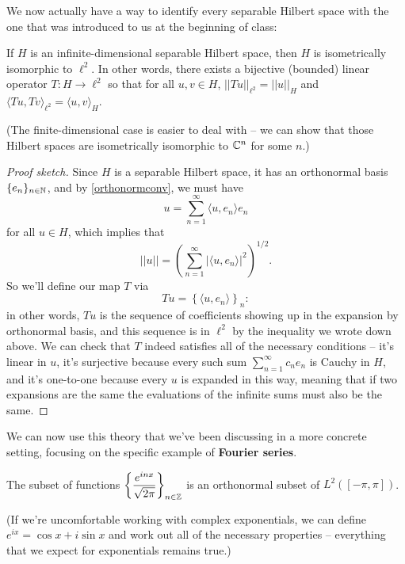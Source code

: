 We now actually have a way to identify every separable Hilbert space with the one that was introduced to us at the beginning of class:

\begin{theorem}
If $H$ is an infinite-dimensional separable Hilbert space, then $H$ is isometrically isomorphic to $\ell^2$. In other words, there exists a bijective (bounded) linear operator $T: H \to \ell^2$ so that for all $u, v \in H$, $||Tu||_{\ell^2} = ||u||_H$ and $\langle Tu, Tv \rangle_{\ell^2} = \langle u, v \rangle_H$.
\end{theorem}

(The finite-dimensional case is easier to deal with -- we can show that those Hilbert spaces are isometrically isomorphic to $\mathbb C^n$ for some $n$.)

\begin{proof}[Proof sketch]
Since $H$ is a separable Hilbert space, it has an orthonormal basis $\{e_n\}_{n \in \mathbb N}$, and by \cref{orthonormconv}, we must have
\[
    u = \sum_{n=1}^{\infty} \langle u, e_n \rangle e_n
\]
for all $u \in H$, which implies that
\[
    ||u|| = \left(\sum_{n=1}^{\infty} |\langle u, e_n \rangle|^2\right)^{1/2}.
\]
So we'll define our map $T$ via
\[
    Tu = \left\{\langle u, e_n \rangle\right\}_n:
\]
in other words, $Tu$ is the sequence of coefficients showing up in the expansion by orthonormal basis, and this sequence is in $\ell^2$ by the inequality we wrote down above. We can check that $T$ indeed satisfies all of the necessary conditions -- it's linear in $u$, it's surjective because every such sum $\sum_{n=1}^{\infty} c_n e_n$ is Cauchy in $H$, and it's one-to-one because every $u$ is expanded in this way, meaning that if two expansions are the same the evaluations of the infinite sums must also be the same.
\end{proof}

We can now use this theory that we've been discussing in a more concrete setting, focusing on the specific example of \textbf{Fourier series}. 

\begin{proposition}
The subset of functions $\left\{\dfrac{e^{inx}}{\sqrt{2\pi}}\right\}_{n \in \mathbb Z}$ is an orthonormal subset of $L^2([-\pi, \pi])$.
\end{proposition}

(If we're uncomfortable working with complex exponentials, we can define $e^{ix} = \cos x + i \sin x$ and work out all of the necessary properties -- everything that we expect for exponentials remains true.)


